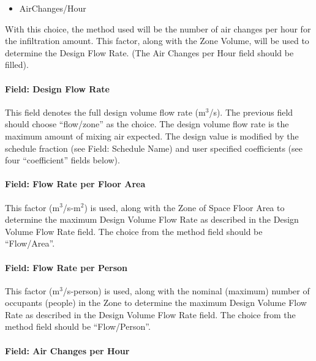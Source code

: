 \begin{itemize}
\tightlist
\item
  AirChanges/Hour
\end{itemize}

With this choice, the method used will be the number of air changes per hour for the infiltration amount. This factor, along with the Zone Volume, will be used to determine the Design Flow Rate. (The Air Changes per Hour field should be filled).

\paragraph{Field: Design Flow Rate}\label{field-design-flow-rate-2}

This field denotes the full design volume flow rate (m\(^{3}\)/s). The previous field should choose ``flow/zone'' as the choice. The design volume flow rate is the maximum amount of mixing air expected. The design value is modified by the schedule fraction (see Field: Schedule Name) and user specified coefficients (see four ``coefficient'' fields below).

\paragraph{Field: Flow Rate per Floor Area}\label{field-flow-rate-per-zone-floor-area-1}

This factor (m\(^{3}\)/s-m\(^{2}\)) is used, along with the Zone of Space Floor  Area to determine the maximum Design Volume Flow Rate as described in the Design Volume Flow Rate field. The choice from the method field should be ``Flow/Area''.

\paragraph{Field: Flow Rate per Person}\label{field-flow-rate-per-person-1}

This factor (m\(^{3}\)/s-person) is used, along with the nominal (maximum) number of occupants (people) in the Zone to determine the maximum Design Volume Flow Rate as described in the Design Volume Flow Rate field. The choice from the method field should be ``Flow/Person''.

\paragraph{Field: Air Changes per Hour}\label{field-air-changes-per-hour-2}

